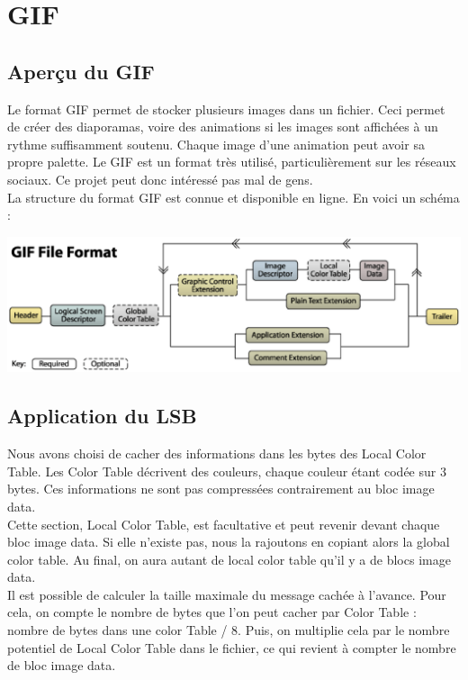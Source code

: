 \section{GIF}

\subsection{Aperçu du GIF}
Le format GIF permet de stocker plusieurs images dans un fichier. 
Ceci permet de créer des diaporamas, voire des animations si les images sont affichées à un rythme suffisamment soutenu. 
Chaque image d'une animation peut avoir sa propre palette.
Le GIF est un format très utilisé, particulièrement sur les réseaux sociaux. 
Ce projet peut donc intéressé pas mal de gens.\\
La structure du format GIF est connue et disponible en ligne. En voici un schéma : 

\vspace{1.5cm}
\includegraphics[width=15cm]{gif_structure.eps}

\vspace{1.5cm}
\subsection{Application du LSB}
Nous avons choisi de cacher des informations dans les bytes des Local Color Table. 
Les Color Table décrivent des couleurs, chaque couleur étant codée sur 3 bytes. 
Ces informations ne sont pas compressées contrairement au bloc image data.\\

Cette section, Local Color Table, est facultative et peut revenir devant chaque bloc image data. 
Si elle n'existe pas, nous la rajoutons en copiant
alors la global color table.
Au final, on aura autant de local color table qu'il y a de blocs image data.\\

Il est possible de calculer la taille maximale du message cachée à l'avance. 
Pour cela, on compte le nombre de bytes que l'on peut cacher par Color Table : nombre de bytes dans une color Table / 8.
Puis, on multiplie cela par le nombre potentiel de Local Color Table dans le fichier, ce qui revient à compter le nombre de bloc image data.\\

